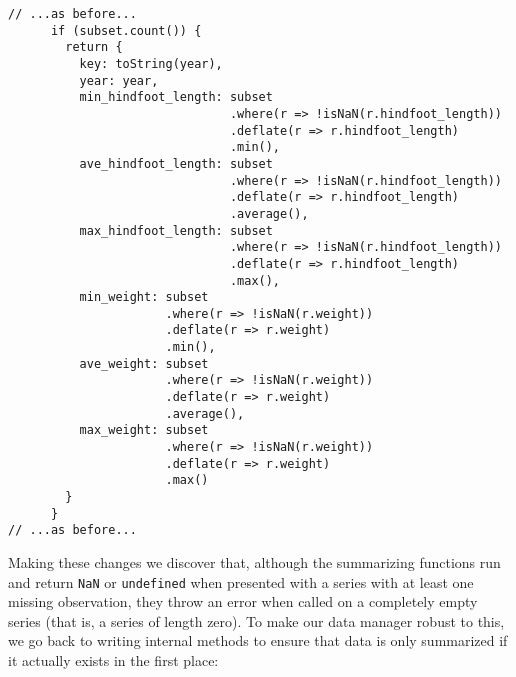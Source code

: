 \begin{verbatim}
// ...as before...
      if (subset.count()) {
        return {
          key: toString(year),
          year: year,
          min_hindfoot_length: subset
                               .where(r => !isNaN(r.hindfoot_length))
                               .deflate(r => r.hindfoot_length)
                               .min(),
          ave_hindfoot_length: subset
                               .where(r => !isNaN(r.hindfoot_length))
                               .deflate(r => r.hindfoot_length)
                               .average(),
          max_hindfoot_length: subset
                               .where(r => !isNaN(r.hindfoot_length))
                               .deflate(r => r.hindfoot_length)
                               .max(),
          min_weight: subset
                      .where(r => !isNaN(r.weight))
                      .deflate(r => r.weight)
                      .min(),
          ave_weight: subset
                      .where(r => !isNaN(r.weight))
                      .deflate(r => r.weight)
                      .average(),
          max_weight: subset
                      .where(r => !isNaN(r.weight))
                      .deflate(r => r.weight)
                      .max()
        }
      }
// ...as before...
\end{verbatim}

Making these changes we discover that,
although the summarizing functions run and return
\texttt{NaN} or \texttt{undefined}
when presented with a series with at least one missing observation,
they throw an error when called on a completely empty series
(that is, a series of length zero).
To make our data manager robust to this,
we go back to writing internal methods
to ensure that data is only summarized
if it actually exists in the first place:

